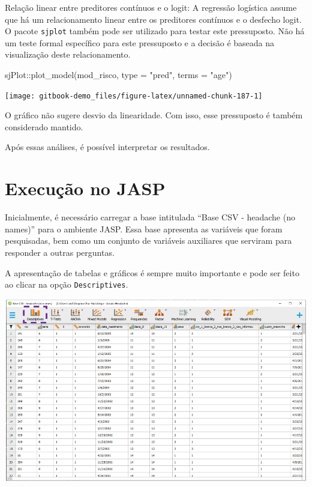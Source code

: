 \documentclass[
]{book}
\newenvironment{Shaded}{\begin{snugshade}}{\end{snugshade}}
\newcommand{\AttributeTok}[1]{\textcolor[rgb]{0.77,0.63,0.00}{#1}}
\newcommand{\FunctionTok}[1]{\textcolor[rgb]{0.00,0.00,0.00}{#1}}
\newcommand{\NormalTok}[1]{#1}
\newcommand{\SpecialCharTok}[1]{\textcolor[rgb]{0.00,0.00,0.00}{#1}}
\newcommand{\StringTok}[1]{\textcolor[rgb]{0.31,0.60,0.02}{#1}}
\begin{document}
Relação linear entre preditores contínuos e o logit: A regressão logística assume que há um relacionamento linear entre os preditores contínuos e o desfecho logit. O pacote \texttt{sjplot} também pode ser utilizado para testar este pressuposto. Não há um teste formal específico para este pressuposto e a decisão é baseada na visualização deste relacionamento.

\begin{Shaded}
\begin{Highlighting}[]
\NormalTok{sjPlot}\SpecialCharTok{::}\FunctionTok{plot\_model}\NormalTok{(mod\_risco, }\AttributeTok{type =} \StringTok{"pred"}\NormalTok{, }\AttributeTok{terms =}  \StringTok{"age"}\NormalTok{)}
\end{Highlighting}
\end{Shaded}

\begin{center}\texttt{[image: gitbook-demo\_files/figure-latex/unnamed-chunk-187-1]} \end{center}

O gráfico não sugere desvio da linearidade. Com isso, esse pressuposto é também considerado mantido.

Após essas análises, é possível interpretar os resultados.

\hypertarget{execuuxe7uxe3o-no-jasp-17}{%
\section{Execução no JASP}\label{execuuxe7uxe3o-no-jasp-17}}

Inicialmente, é necessário carregar a base intitulada ``Base CSV - headache (no names)'' para o ambiente JASP. Essa base apresenta as variáveis que foram pesquisadas, bem como um conjunto de variáveis auxiliares que serviram para responder a outras perguntas.

A apresentação de tabelas e gráficos é sempre muito importante e pode ser feito ao clicar na opção \texttt{Descriptives}.

\includegraphics{./img/cap_logistica_base.png}
\end{document}
